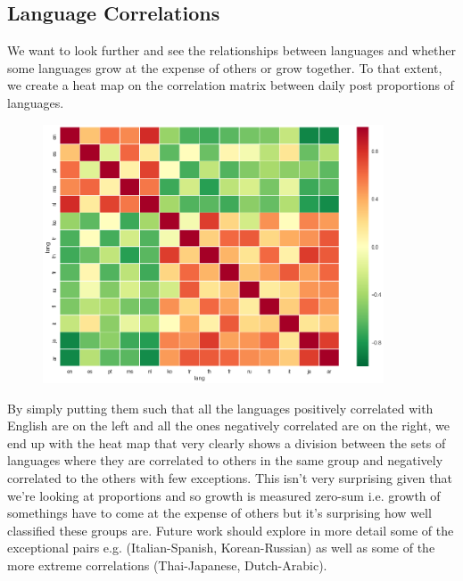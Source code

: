 \documentclass[12pt]{article}
\begin{document}
\subsection{Language Correlations}
We want to look further and see the relationships between languages and whether some languages grow at the expense of others or grow together. To that extent, we create a heat map on the correlation matrix between daily post proportions of languages.
\FloatBarrier
\begin{figure}[hbtp]\centering
\includegraphics[width=0.9\textwidth,clip]{images/correlation.png}
\end{figure}
\FloatBarrier
By simply putting them such that all the languages positively correlated with English are on the left and all the ones negatively correlated are on the right, we end up with the heat map that very clearly shows a division between the sets of languages where they are correlated to others in the same group and negatively correlated to the others with few exceptions. This isn't very surprising given that we're looking at proportions and so growth is measured zero-sum i.e. growth of somethings have to come at the expense of others but it's surprising how well classified these groups are. Future work should explore in more detail some of the exceptional pairs e.g. (Italian-Spanish, Korean-Russian) as well as some of the more extreme correlations (Thai-Japanese, Dutch-Arabic).
\end{document}
